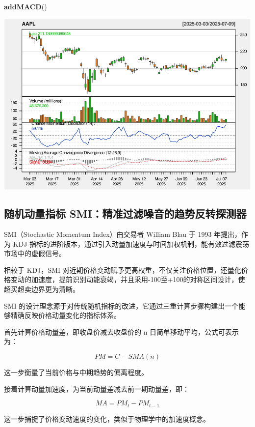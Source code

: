 \documentclass[]{ctexbook}
\newenvironment{Shaded}{\begin{snugshade}}{\end{snugshade}}
\newcommand{\FunctionTok}[1]{\textcolor[rgb]{0.13,0.29,0.53}{\textbf{#1}}}
\newcommand{\NormalTok}[1]{#1}
\begin{document}
\begin{Shaded}
\begin{Highlighting}[]
\FunctionTok{addMACD}\NormalTok{()}
\end{Highlighting}
\end{Shaded}

\includegraphics[width=0.9\linewidth]{quantmod_files/figure-latex/cmo_2-3}

\subsection{随机动量指标 SMI：精准过滤噪音的趋势反转探测器}\label{ux968fux673aux52a8ux91cfux6307ux6807-smiux7cbeux51c6ux8fc7ux6ee4ux566aux97f3ux7684ux8d8bux52bfux53cdux8f6cux63a2ux6d4bux5668}

SMI（Stochastic Momentum Index）由交易者 William Blau 于 1993 年提出，作为 KDJ 指标的进阶版本，通过引入动量加速度与时间加权机制，能有效过滤震荡市场中的虚假信号。

相较于 KDJ，SMI 对近期价格变动赋予更高权重，不仅关注价格位置，还量化价格变动的加速度，提前识别动能衰竭，并且采用-100至+100的对称区间设计，使超买超卖边界更为清晰。

SMI 的设计理念源于对传统随机指标的改进，它通过三重计算步骤构建出一个能够精确反映价格动量变化的指标体系。

首先计算价格动量差，即收盘价减去收盘价的 n 日简单移动平均，公式可表示为：

\[PM = C - SMA(n)\]

这一步衡量了当前价格与中期趋势的偏离程度。

接着计算动量加速度，为当前动量差减去前一期动量差，即：

\[MA = PM_t - PM_{t-1}\]

这一步捕捉了价格变动速度的变化，类似于物理学中的加速度概念。
\end{document}
